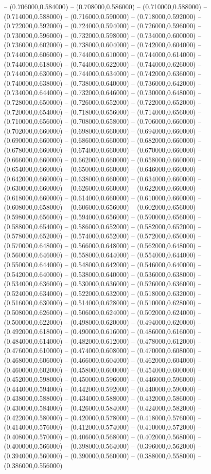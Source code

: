 -- (0.706000,0.584000) -- (0.708000,0.586000) -- (0.710000,0.588000) -- (0.714000,0.588000) -- (0.716000,0.590000) -- (0.718000,0.592000) -- (0.722000,0.592000) -- (0.724000,0.594000) -- (0.726000,0.596000) -- (0.730000,0.596000) -- (0.732000,0.598000) -- (0.734000,0.600000) -- (0.736000,0.602000) -- (0.738000,0.604000) -- (0.742000,0.604000) -- (0.744000,0.606000) -- (0.744000,0.610000) -- (0.744000,0.614000) -- (0.744000,0.618000) -- (0.744000,0.622000) -- (0.744000,0.626000) -- (0.744000,0.630000) -- (0.744000,0.634000) -- (0.742000,0.636000) -- (0.740000,0.638000) -- (0.738000,0.640000) -- (0.736000,0.642000) -- (0.734000,0.644000) -- (0.732000,0.646000) -- (0.730000,0.648000) -- (0.728000,0.650000) -- (0.726000,0.652000) -- (0.722000,0.652000) -- (0.720000,0.654000) -- (0.718000,0.656000) -- (0.714000,0.656000) -- (0.710000,0.656000) -- (0.708000,0.658000) -- (0.706000,0.660000) -- (0.702000,0.660000) -- (0.698000,0.660000) -- (0.694000,0.660000) -- (0.690000,0.660000) -- (0.686000,0.660000) -- (0.682000,0.660000) -- (0.678000,0.660000) -- (0.674000,0.660000) -- (0.670000,0.660000) -- (0.666000,0.660000) -- (0.662000,0.660000) -- (0.658000,0.660000) -- (0.654000,0.660000) -- (0.650000,0.660000) -- (0.646000,0.660000) -- (0.642000,0.660000) -- (0.638000,0.660000) -- (0.634000,0.660000) -- (0.630000,0.660000) -- (0.626000,0.660000) -- (0.622000,0.660000) -- (0.618000,0.660000) -- (0.614000,0.660000) -- (0.610000,0.660000) -- (0.608000,0.658000) -- (0.606000,0.656000) -- (0.602000,0.656000) -- (0.598000,0.656000) -- (0.594000,0.656000) -- (0.590000,0.656000) -- (0.588000,0.654000) -- (0.586000,0.652000) -- (0.582000,0.652000) -- (0.578000,0.652000) -- (0.574000,0.652000) -- (0.572000,0.650000) -- (0.570000,0.648000) -- (0.566000,0.648000) -- (0.562000,0.648000) -- (0.560000,0.646000) -- (0.558000,0.644000) -- (0.554000,0.644000) -- (0.550000,0.644000) -- (0.548000,0.642000) -- (0.546000,0.640000) -- (0.542000,0.640000) -- (0.538000,0.640000) -- (0.536000,0.638000) -- (0.534000,0.636000) -- (0.530000,0.636000) -- (0.526000,0.636000) -- (0.524000,0.634000) -- (0.522000,0.632000) -- (0.518000,0.632000) -- (0.516000,0.630000) -- (0.514000,0.628000) -- (0.510000,0.628000) -- (0.508000,0.626000) -- (0.506000,0.624000) -- (0.502000,0.624000) -- (0.500000,0.622000) -- (0.498000,0.620000) -- (0.494000,0.620000) -- (0.492000,0.618000) -- (0.490000,0.616000) -- (0.486000,0.616000) -- (0.484000,0.614000) -- (0.482000,0.612000) -- (0.478000,0.612000) -- (0.476000,0.610000) -- (0.474000,0.608000) -- (0.470000,0.608000) -- (0.468000,0.606000) -- (0.466000,0.604000) -- (0.462000,0.604000) -- (0.460000,0.602000) -- (0.458000,0.600000) -- (0.454000,0.600000) -- (0.452000,0.598000) -- (0.450000,0.596000) -- (0.446000,0.596000) -- (0.444000,0.594000) -- (0.442000,0.592000) -- (0.440000,0.590000) -- (0.438000,0.588000) -- (0.434000,0.588000) -- (0.432000,0.586000) -- (0.430000,0.584000) -- (0.426000,0.584000) -- (0.424000,0.582000) -- (0.422000,0.580000) -- (0.420000,0.578000) -- (0.418000,0.576000) -- (0.414000,0.576000) -- (0.412000,0.574000) -- (0.410000,0.572000) -- (0.408000,0.570000) -- (0.406000,0.568000) -- (0.402000,0.568000) -- (0.400000,0.566000) -- (0.398000,0.564000) -- (0.396000,0.562000) -- (0.394000,0.560000) -- (0.390000,0.560000) -- (0.388000,0.558000) -- (0.386000,0.556000) 